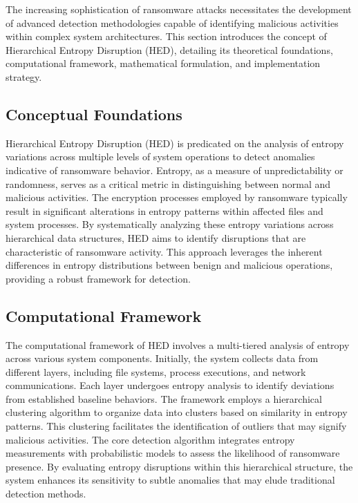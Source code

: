 \documentclass[lettersize,journal]{IEEEtran}
\begin{document}
The increasing sophistication of ransomware attacks necessitates the development of advanced detection methodologies capable of identifying malicious activities within complex system architectures. This section introduces the concept of Hierarchical Entropy Disruption (HED), detailing its theoretical foundations, computational framework, mathematical formulation, and implementation strategy.

\subsection{Conceptual Foundations}

Hierarchical Entropy Disruption (HED) is predicated on the analysis of entropy variations across multiple levels of system operations to detect anomalies indicative of ransomware behavior. Entropy, as a measure of unpredictability or randomness, serves as a critical metric in distinguishing between normal and malicious activities. The encryption processes employed by ransomware typically result in significant alterations in entropy patterns within affected files and system processes. By systematically analyzing these entropy variations across hierarchical data structures, HED aims to identify disruptions that are characteristic of ransomware activity. This approach leverages the inherent differences in entropy distributions between benign and malicious operations, providing a robust framework for detection.

\subsection{Computational Framework}

The computational framework of HED involves a multi-tiered analysis of entropy across various system components. Initially, the system collects data from different layers, including file systems, process executions, and network communications. Each layer undergoes entropy analysis to identify deviations from established baseline behaviors. The framework employs a hierarchical clustering algorithm to organize data into clusters based on similarity in entropy patterns. This clustering facilitates the identification of outliers that may signify malicious activities. The core detection algorithm integrates entropy measurements with probabilistic models to assess the likelihood of ransomware presence. By evaluating entropy disruptions within this hierarchical structure, the system enhances its sensitivity to subtle anomalies that may elude traditional detection methods.
\end{document}
